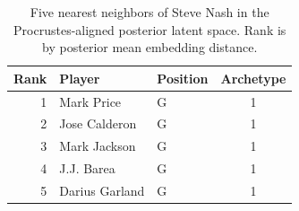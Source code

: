 \begin{table}[htbp]
  \centering\small
  \begin{tabular}{rllc}
    \toprule
    Rank & Player & Position & Archetype \\
    \midrule
    1 & Mark Price & G & 1 \\
    2 & Jose Calderon & G & 1 \\
    3 & Mark Jackson & G & 1 \\
    4 & J.J. Barea & G & 1 \\
    5 & Darius Garland & G & 1 \\
    \bottomrule
  \end{tabular}
  \caption{Five nearest neighbors of Steve Nash in the Procrustes-aligned posterior latent space. Rank is by posterior mean embedding distance.}
  \label{tab:Steve_Nash_neighbors}
\end{table}

